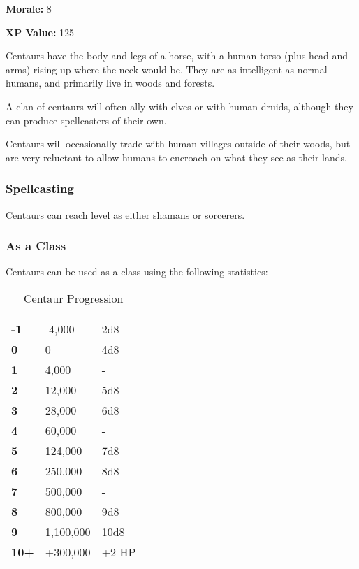 \begin{multicols*}{2}
{\textbf{Morale:} 8

\textbf{XP Value:} 125}

Centaurs have the body and legs of a horse, with a human torso (plus head and arms) rising up where the neck would be. They are as intelligent as normal humans, and primarily live in woods and forests.

A clan of centaurs will often ally with elves or with human druids, although they can produce spellcasters of their own.

Centaurs will occasionally trade with human villages outside of their woods, but are very reluctant to allow humans to encroach on what they see as their lands.

\subsubsection{Spellcasting}
Centaurs can reach  level as either shamans or sorcerers.

\subsubsection{As a Class}
Centaurs can be used as a class using the following statistics:


\begin {table}[H]
  \caption{Centaur Progression}
  \begin{tabularx}{\columnwidth}{>{\bfseries}YYY}
	 &  & \\
	-1 & -4,000 & 2d8\\
	0 & 0 & 4d8\\
	1 & 4,000 & -\\
	2 & 12,000 & 5d8\\
	3 & 28,000 & 6d8\\
	4 & 60,000 & -\\
	5 & 124,000 & 7d8\\
	6 & 250,000 & 8d8\\
	7 & 500,000 & -\\
	8 & 800,000 & 9d8\\
	9 & 1,100,000 & 10d8\\
	10+ & +300,000 & +2 HP
  \end {tabularx}
\end {table}


\end{multicols*}
